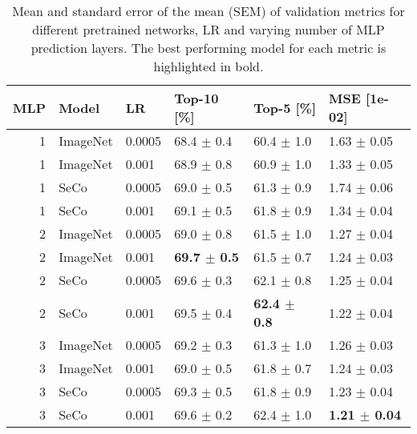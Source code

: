 \begin{table}[h]
\caption{Mean and standard error of the mean (SEM) of validation metrics for different pretrained networks, LR and varying number of MLP prediction layers.  The best performing model for each metric is highlighted in bold.}
\label{tab:mlp-layer_pretrained_lr}
\begin{tabular}{rlllll}
\toprule
MLP & Model & LR & Top-10 [\%] & Top-5 [\%] & MSE [1e-02] \\
\midrule
1 & ImageNet & 0.0005 & 68.4 $\pm$ 0.4 & 60.4 $\pm$ 1.0 & 1.63 $\pm$ 0.05 \\
1 & ImageNet & 0.001 & 68.9 $\pm$ 0.8 & 60.9 $\pm$ 1.0 & 1.33 $\pm$ 0.05 \\
1 & SeCo & 0.0005 & 69.0 $\pm$ 0.5 & 61.3 $\pm$ 0.9 & 1.74 $\pm$ 0.06 \\
1 & SeCo & 0.001 & 69.1 $\pm$ 0.5 & 61.8 $\pm$ 0.9 & 1.34 $\pm$ 0.04 \\
2 & ImageNet & 0.0005 & 69.0 $\pm$ 0.8 & 61.5 $\pm$ 1.0 & 1.27 $\pm$ 0.04 \\
2 & ImageNet & 0.001 & \textbf{69.7 $\pm$ 0.5} & 61.5 $\pm$ 0.7 & 1.24 $\pm$ 0.03 \\
2 & SeCo & 0.0005 & 69.6 $\pm$ 0.3 & 62.1 $\pm$ 0.8 & 1.25 $\pm$ 0.04 \\
2 & SeCo & 0.001 & 69.5 $\pm$ 0.4 & \textbf{62.4 $\pm$ 0.8} & 1.22 $\pm$ 0.04 \\
3 & ImageNet & 0.0005 & 69.2 $\pm$ 0.3 & 61.3 $\pm$ 1.0 & 1.26 $\pm$ 0.03 \\
3 & ImageNet & 0.001 & 69.0 $\pm$ 0.5 & 61.8 $\pm$ 0.7 & 1.24 $\pm$ 0.03 \\
3 & SeCo & 0.0005 & 69.3 $\pm$ 0.5 & 61.8 $\pm$ 0.9 & 1.23 $\pm$ 0.04 \\
3 & SeCo & 0.001 & 69.6 $\pm$ 0.2 & 62.4 $\pm$ 1.0 & \textbf{1.21 $\pm$ 0.04} \\
\bottomrule
\end{tabular}
\end{table}
